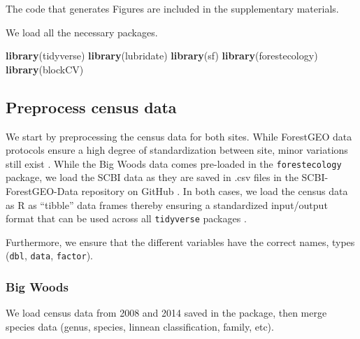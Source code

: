 \documentclass[12pt]{article}
\newenvironment{Shaded}{\begin{snugshade}}{\end{snugshade}}
\newcommand{\DataTypeTok}[1]{\textcolor[rgb]{0.13,0.29,0.53}{#1}}
\newcommand{\DecValTok}[1]{\textcolor[rgb]{0.00,0.00,0.81}{#1}}
\newcommand{\KeywordTok}[1]{\textcolor[rgb]{0.13,0.29,0.53}{\textbf{#1}}}
\newcommand{\NormalTok}[1]{#1}
\newcommand{\OperatorTok}[1]{\textcolor[rgb]{0.81,0.36,0.00}{\textbf{#1}}}
\newcommand{\StringTok}[1]{\textcolor[rgb]{0.31,0.60,0.02}{#1}}
\begin{document}
The code that generates Figures are included in the supplementary
materials.

We load all the necessary packages.

\begin{Shaded}
\begin{Highlighting}[]
\KeywordTok{library}\NormalTok{(tidyverse)}
\KeywordTok{library}\NormalTok{(lubridate)}
\KeywordTok{library}\NormalTok{(sf)}
\KeywordTok{library}\NormalTok{(forestecology)}
\KeywordTok{library}\NormalTok{(blockCV)}
\end{Highlighting}
\end{Shaded}

\hypertarget{preprocess-census-data}{%
\subsection{Preprocess census data}\label{preprocess-census-data}}

We start by preprocessing the census data for both sites. While
ForestGEO data protocols ensure a high degree of standardization between
site, minor variations still exist
\citet{andersonteixeira_ctfs-forestgeo_2015}. While the Big Woods data
comes pre-loaded in the \texttt{forestecology} package, we load the SCBI
data as they are saved in .csv files in the SCBI-ForestGEO-Data
repository on GitHub
\citet{gonzalez-akre_scbi-forestgeoscbi-forestgeo-data_2020}. In both
cases, we load the census data as R as ``tibble'' data frames thereby
ensuring a standardized input/output format that can be used across all
\texttt{tidyverse} packages \citet{wickham_welcome_2019}.

Furthermore, we ensure that the different variables have the correct
names, types (\texttt{dbl}, \texttt{data}, \texttt{factor}).

\hypertarget{big-woods}{%
\subsubsection{Big Woods}\label{big-woods}}

We load census data from 2008 and 2014 saved in the package, then merge
species data (genus, species, linnean classification, family, etc).

\begin{Shaded}
\end{Shaded}
\end{document}
